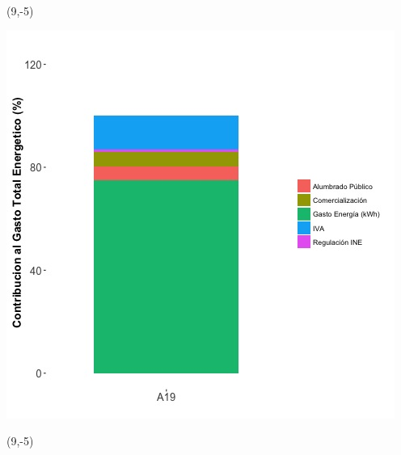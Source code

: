 \documentclass{article}\usepackage[]{graphicx}\usepackage[]{color}
\newenvironment{knitrout}{}{} %
\begin{document}
 \begin{textblock}{1}(9,-5)
\begin{minipage}{20em}
\begingroup

\endgroup
\end{minipage}
\end{textblock}

\begin{knitrout}
\color{fgcolor}
\includegraphics[scale=0.65]{figure/A19_costvars_plot.jpg} 
\end{knitrout}

 \begin{textblock}{1}(9,-5)
\begin{minipage}{20em}
\begingroup

\endgroup
\end{minipage}
\end{textblock}
\end{document}

